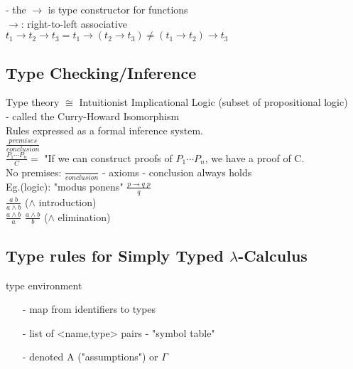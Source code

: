 \documentclass[11pt]{article}
\begin{document}
- the $\rightarrow$ is type constructor for functions \\

$\rightarrow$: right-to-left associative \\

$t_1 \rightarrow t_2 \rightarrow t_3 = t_1 \rightarrow (t_2 \rightarrow t_3) \neq (t_1 \rightarrow t_2) \rightarrow t_3$ \\

\subsection{Type Checking/Inference}

Type theory $\cong$ Intuitionist Implicational Logic (subset of propositional logic) \\

- called the Curry-Howard Isomorphism \\

Rules expressed as a formal inference system. \\

$\frac{premises}{conclusion}$ \\

$\frac{P_1 \cdots P_n}{C} = $ "If we can construct proofs of $P_1 \cdots P_n$, we have a proof of C. \\

No premises: $\frac{}{conclusion}$ - axioms - conclusion always holds \\

Eg.(logic): "modus ponens" $\frac{p\rightarrow q\;p}{q}$ \\

$\frac{a\;b}{a \land b}$ ($\land$ introduction) \\

$\frac{a \land b}{a}$  $\frac{a \land b}{b}$ ($\land$ elimination) \\

\subsection{Type rules for Simply Typed $\lambda$-Calculus} 

type environment
\begin{itemize}
	\item[-] map from identifiers to types
	\item[-] list of <name,type> pairs - "symbol table"
	\item[-] denoted A ("assumptions") or $\Gamma$ 
\end{itemize}
\end{document}
